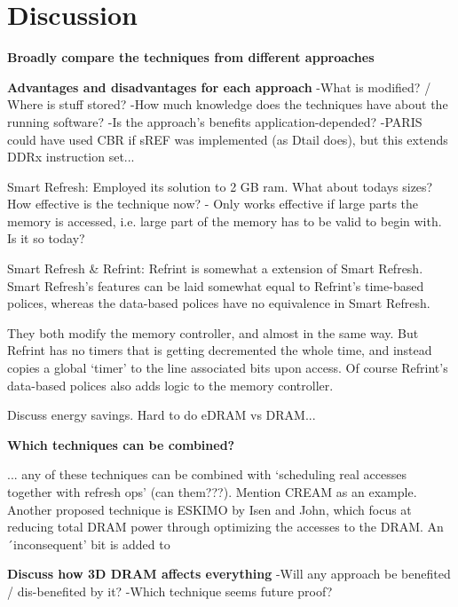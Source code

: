 \section{Discussion} 
\label{sec:disc}

\textbf{Broadly compare the techniques from different approaches}

\textbf{Advantages and disadvantages for each approach}
-What is modified? / Where is stuff stored?
-How much knowledge does the techniques have about the running software?
-Is the approach's benefits application-depended?
-PARIS could have used CBR if sREF was implemented (as Dtail does), but this extends DDRx instruction set...

Smart Refresh:
Employed its solution to 2 GB ram. What about todays sizes? How effective is the technique now? - Only works effective if large parts the memory is accessed, i.e. large part of the memory has to be valid to begin with. Is it so today?

Smart Refresh \& Refrint:
Refrint is somewhat a extension of Smart Refresh. Smart Refresh's features can be laid somewhat equal to Refrint's time-based polices, whereas the data-based polices have no equivalence in Smart Refresh.

They both modify the memory controller, and almost in the same way. But Refrint has no timers that is getting decremented the whole time, and instead copies a global `timer' to the line associated bits upon access. Of course Refrint's data-based polices also adds logic to the memory controller.

Discuss energy savings. Hard to do eDRAM vs DRAM...

\textbf{Which techniques can be combined?}

... any of these techniques can be combined with `scheduling real accesses together with refresh ops' (can them???). Mention CREAM as an example. 
Another proposed technique is ESKIMO by Isen and John, which focus at reducing total DRAM power through optimizing the accesses to the DRAM. An ´inconsequent' bit is added to  

\textbf{Discuss how 3D DRAM affects everything}
-Will any approach be benefited / dis-benefited by it?
-Which technique seems future proof?